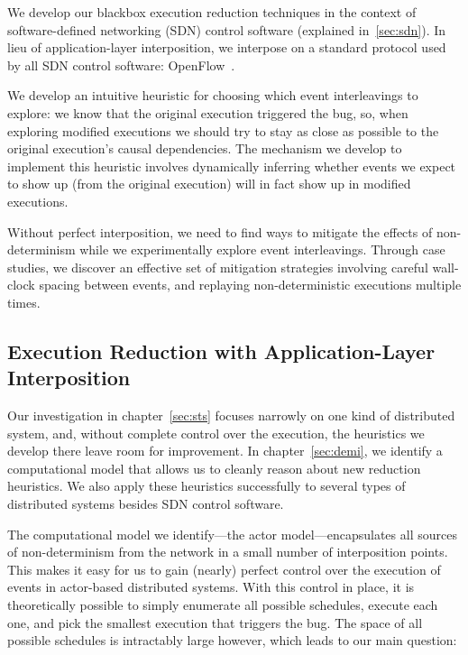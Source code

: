 We develop our blackbox execution reduction techniques
in the context of software-defined
networking (SDN) control software (explained in~\ref{sec:sdn}). In lieu of
application-layer interposition, we interpose on a standard
protocol used by all SDN control software: OpenFlow~\cite{openflow}.

We develop an intuitive heuristic for
choosing which event interleavings to explore: we know that the original execution triggered the bug, so, when exploring modified executions we should try to stay as close as possible to the original execution's causal dependencies.
The mechanism we develop to implement this heuristic involves dynamically inferring whether events we expect to show up (from the original execution) will in fact show up in modified executions.

Without perfect interposition, we need to find ways to mitigate the effects of
non-determinism while we experimentally explore event interleavings.
Through case studies, we discover an effective set of mitigation strategies involving careful wall-clock spacing between events, and replaying non-deterministic executions multiple times.

\subsection{Execution Reduction with Application-Layer Interposition}

Our investigation in chapter~\ref{sec:sts} focuses narrowly on one kind of
distributed system, and, without complete control over the execution, the heuristics we
develop there leave room for improvement. In chapter~\ref{sec:demi},
we identify a computational model that allows us to cleanly reason
about new reduction heuristics. We also apply these heuristics successfully
to several types of distributed systems besides SDN control software.

The computational model we identify---the actor model---encapsulates all sources of
non-determinism from the network in a small number of interposition points.
This makes it easy for us to gain (nearly) perfect control over the execution of events in actor-based distributed systems.
With this control in place, it is theoretically possible to simply enumerate all possible schedules, execute each one, and pick the smallest execution that triggers the bug.
The space of all possible schedules is intractably large however, which leads to our main question:

